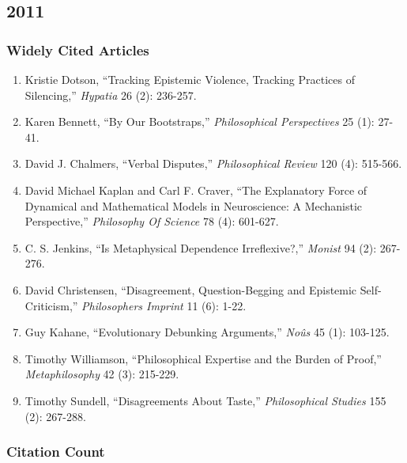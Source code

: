 \documentclass[
  10pt,
  letterpaper,
  DIV=11,
  numbers=noendperiod,
  twoside]{scrartcl}
\providecommand{\tightlist}{%
  \setlength{\itemsep}{0pt}\setlength{\parskip}{0pt}}\usepackage{longtable,booktabs,array}
\begin{document}
\newpage

\subsection{2011}\label{sec-s2011}

\subsubsection*{Widely Cited Articles}\label{widely-cited-articles-35}

\begin{enumerate}
\def\labelenumi{\arabic{enumi}.}
\tightlist
\item
  Kristie Dotson, ``Tracking Epistemic Violence, Tracking Practices of
  Silencing,'' \emph{Hypatia} 26 (2): 236-257.
\item
  Karen Bennett, ``By Our Bootstraps,'' \emph{Philosophical
  Perspectives} 25 (1): 27-41.
\item
  David J. Chalmers, ``Verbal Disputes,'' \emph{Philosophical Review}
  120 (4): 515-566.
\item
  David Michael Kaplan and Carl F. Craver, ``The Explanatory Force of
  Dynamical and Mathematical Models in Neuroscience: A Mechanistic
  Perspective,'' \emph{Philosophy Of Science} 78 (4): 601-627.
\item
  C. S. Jenkins, ``Is Metaphysical Dependence Irreflexive?,''
  \emph{Monist} 94 (2): 267-276.
\item
  David Christensen, ``Disagreement, Question-Begging and Epistemic
  Self-Criticism,'' \emph{Philosophers Imprint} 11 (6): 1-22.
\item
  Guy Kahane, ``Evolutionary Debunking Arguments,'' \emph{Noûs} 45 (1):
  103-125.
\item
  Timothy Williamson, ``Philosophical Expertise and the Burden of
  Proof,'' \emph{Metaphilosophy} 42 (3): 215-229.
\item
  Timothy Sundell, ``Disagreements About Taste,'' \emph{Philosophical
  Studies} 155 (2): 267-288.
\end{enumerate}

\subsubsection*{Citation Count}\label{sec-count-2011}
\end{document}
